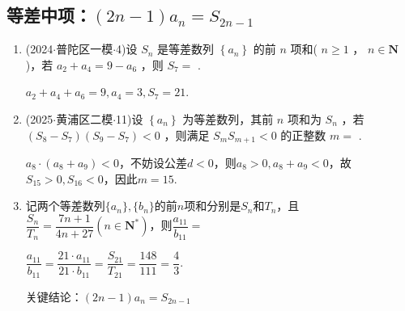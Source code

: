 \subsection*{等差中项：$(2n-1)a_n = S_{2n-1}$}
\begin{enumerate}
    \item (2024$\cdot$普陀区一模$\cdot$4)设 ${S}_{n}$ 是等差数列 $\left\{  {a}_{n}\right\}$ 的前 $n$ 项和( $n \geq  1$ ， $n \in  \mathbf{N}$ )，若 ${a}_{2} + {a}_{4} = 9 - {a}_{6}$ ，则 ${S}_{7} =$ .
    \begin{jieda}
        $a_2+a_4+a_6 = 9, a_4 = 3, S_7 = 21$.
    \end{jieda}
    \item (2025$\cdot$黄浦区二模$\cdot$11)设 $\left\{  {a}_{n}\right\}$ 为等差数列，其前 $n$ 项和为 ${S}_{n}$ ，若 $\left( {{S}_{8} - {S}_{7}}\right)({S}_{9} - {S}_{7}) < 0$ ，则满足 ${S}_{m}{S}_{m + 1} < 0$ 的正整数 $m =$ .
    \begin{jieda}
        $a_8 \cdot \left(a_8+a_9\right) < 0$，不妨设公差$d < 0$，则$a_8 > 0, a_8+a_9 < 0$，故$S_{15} > 0, S_{16} < 0$，因此$m = 15$.
    \end{jieda}
    \item 记两个等差数列$\{a_n\}, \{b_n\}$的前$n$项和分别是$S_n$和$T_n$，且$\dfrac{S_n}{T_n} = \dfrac{7n+1}{4n+27}(n \in \mathbf{N^*})$，则$\dfrac{a_{11}}{b_{11}} = $
    \begin{jieda}
        $\dfrac{a_{11}}{b_{11}} = \dfrac{21 \cdot a_{11}}{21 \cdot b_{11}} = \dfrac{S_{21}}{T_{21}} = \dfrac{148}{111} = \dfrac{4}{3}$.

        关键结论：$(2n-1)a_n = S_{2n-1}$
    \end{jieda}
\end{enumerate}
